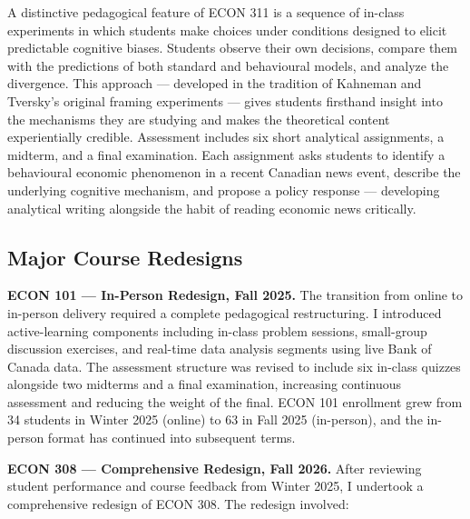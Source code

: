 \documentclass[11pt,letterpaper]{article}
\begin{document}
A distinctive pedagogical feature of ECON 311 is a sequence of in-class experiments in which students make choices under conditions designed to elicit predictable cognitive biases. Students observe their own decisions, compare them with the predictions of both standard and behavioural models, and analyze the divergence. This approach --- developed in the tradition of Kahneman and Tversky's original framing experiments --- gives students firsthand insight into the mechanisms they are studying and makes the theoretical content experientially credible. Assessment includes six short analytical assignments, a midterm, and a final examination. Each assignment asks students to identify a behavioural economic phenomenon in a recent Canadian news event, describe the underlying cognitive mechanism, and propose a policy response --- developing analytical writing alongside the habit of reading economic news critically.

\subsection{Major Course Redesigns}

\textbf{ECON 101 --- In-Person Redesign, Fall 2025.} The transition from online to in-person delivery required a complete pedagogical restructuring. I introduced active-learning components including in-class problem sessions, small-group discussion exercises, and real-time data analysis segments using live Bank of Canada data. The assessment structure was revised to include six in-class quizzes alongside two midterms and a final examination, increasing continuous assessment and reducing the weight of the final. ECON 101 enrollment grew from 34 students in Winter 2025 (online) to 63 in Fall 2025 (in-person), and the in-person format has continued into subsequent terms.

\textbf{ECON 308 --- Comprehensive Redesign, Fall 2026.} After reviewing student performance and course feedback from Winter 2025, I undertook a comprehensive redesign of ECON 308. The redesign involved:
\end{document}
